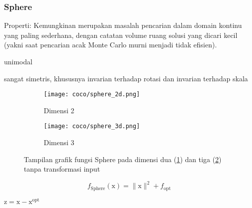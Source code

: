 \subsubsection{Sphere}
\noindent Properti:
Kemungkinan merupakan masalah pencarian dalam domain kontinu yang paling sederhana, dengan catatan volume ruang solusi yang dicari kecil (yakni saat pencarian acak Monte Carlo murni menjadi tidak efisien).
\begin{packed_item}
  \item unimodal
  \item sangat simetris, khususnya invarian terhadap rotasi dan invarian terhadap skala
\end{packed_item}
\begin{figure}[H]
	\centering
	\begin{subfigure}[b]{0.4\textwidth}
		\centering
		\texttt{[image: coco/sphere\_2d.png]}
		\caption{Dimensi 2}
		\label{fig:sphere-coco-2d}
	\end{subfigure}
	\hfill
	\begin{subfigure}[b]{0.4\textwidth}
		\centering
		\texttt{[image: coco/sphere\_3d.png]}
		\caption{Dimensi 3}
		\label{fig:sphere-coco-3d}
	\end{subfigure}
	\caption{Tampilan grafik fungsi Sphere pada dimensi dua (\cref{fig:sphere-coco-2d}) dan tiga (\cref{fig:sphere-coco-3d}) tanpa transformasi input}
	\label{fig:sphere_coco}
\end{figure}
\begin{equation}
  f_{\text{Sphere}}(\mathrm{x})=\|\mathrm{x}\|^2+f_{\text{opt}}
\end{equation}
\begin{packed_item}
    \item $\mathrm{z}=\mathrm{x}-\mathrm{x}^{\text{opt}}$
\end{packed_item}

